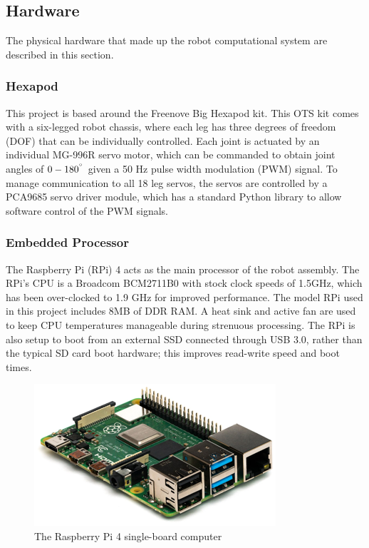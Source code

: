 \subsection{ Hardware }

The physical hardware that made up the robot computational system are described in this section. 

\subsubsection{ Hexapod }

This project is based around the Freenove Big Hexapod kit. This OTS kit comes with a six-legged robot chassis, where each leg has three degrees of freedom (DOF) that can be individually controlled. Each joint is actuated by an individual MG-996R servo motor, which can be commanded to obtain joint angles of $0-180^{\degree}$ given a 50 Hz pulse width modulation (PWM) signal. To manage communication to all 18 leg servos, the servos are controlled by a PCA9685 servo driver module, which has a standard Python library to allow software control of the PWM signals.

\subsubsection{ Embedded Processor }
The Raspberry Pi (RPi) 4 acts as the main processor of the robot assembly.  The RPi's CPU is a Broadcom BCM2711B0 with stock clock speeds of 1.5GHz, which has been over-clocked to 1.9 GHz for improved performance.  The model RPi used in this project includes 8MB of DDR RAM. A heat sink and active fan are used to keep CPU temperatures manageable during strenuous processing. The RPi is also setup to boot from an external SSD connected through USB 3.0, rather than the typical SD card boot hardware; this improves read-write speed and boot times.

\begin{figure}[H]
    \centerline{\includegraphics[scale=0.8]{04_robot_system/figures/pi1.png}}
    \caption{The Raspberry Pi 4 single-board computer}
    \label{fig:raspberry_pi}
\end{figure}

